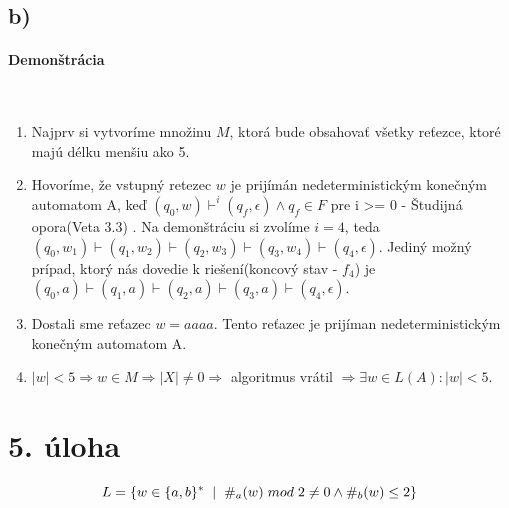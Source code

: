 \documentclass[11pt,a4paper]{article}
\begin{document}
\subsection{b)}

\paragraph{Demonštrácia}\mbox{{}}\\
\begin{enumerate}
  \item Najprv si vytvoríme množinu $M$, ktorá bude obsahovať všetky reťezce, ktoré majú délku menšiu ako 5.

  \item Hovoríme, že vstupný retezec $w$ je prijímán nedeterministickým konečným automatom A, keď  $(q_0, w) \vdash^i (q_f,\epsilon) \land q_f \in F$ pre i >= 0 - Študijná opora(Veta 3.3) \cite{AA}.
Na demonštráciu si zvolíme $i = 4$, teda $(q_0, w_1) \vdash (q_1, w_2) \vdash (q_2, w_3) \vdash (q_3, w_4) \vdash (q_4, \epsilon)$. Jediný možný prípad, ktorý nás dovedie k riešení(koncový stav - $f_4$)
je $(q_0, a) \vdash (q_1, a) \vdash (q_2, a) \vdash (q_3, a) \vdash (q_4, \epsilon)$.

  \item Dostali sme reťazec $w = aaaa$. Tento reťazec je prijíman nedeterministickým konečným automatom A.
  \item $|w| < 5 \Rightarrow w \in M \Rightarrow |X| \ne 0 \Rightarrow$ algoritmus vrátil  $\Rightarrow \exists w \in L(A) : |w| < 5$.
\end{enumerate}


\newpage
\section{5. úloha}

\begin{equation}
L = \{ w \in \{a, b\}^* \hspace{0.2cm}| \hspace{0.2cm} \#_a(w) \hspace{0.1cm} mod \hspace{0.1cm} 2 \ne 0 \land \#_b(w) \le 2 \}
\end{equation}
\end{document}
